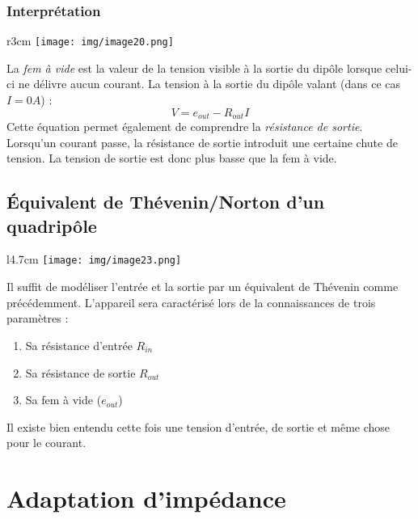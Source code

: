\documentclass[11pt, a4paper, openany]{book}
\begin{document}
		\subsubsection{Interprétation}
		\begin{wrapfigure}[8]{r}{3cm}
			\texttt{[image: img/image20.png]}
		\end{wrapfigure}
		La \textit{fem à vide} est la valeur de la tension visible à la sortie du dipôle lorsque celui-ci ne délivre aucun courant. La tension à la sortie du dipôle valant (dans ce cas $I = 0A$) :
		\begin{equation}
		V = e_{out} - R_{out}I
		\end{equation}
		Cette équation permet également de comprendre la \textit{résistance de sortie}. Lorsqu'un courant passe, la résistance de sortie introduit une certaine chute de tension. La tension de sortie est donc plus basse que la fem à vide.\\
		
		
		
		\setcounter{subsection}{3}
		\subsection{Équivalent de Thévenin/Norton d'un quadripôle}
		\begin{wrapfigure}[8]{l}{4.7cm}
			\texttt{[image: img/image23.png]}
		\end{wrapfigure}
		Il suffit de modéliser l'entrée et la sortie par un équivalent de Thévenin comme précédemment. L'appareil sera caractérisé lors de la connaissances de trois paramètres :
		\begin{enumerate}
			\item Sa résistance d'entrée $R_{in}$
			\item Sa résistance de sortie $R_{out}$
			\item Sa fem à vide ($e_{out}$)
		\end{enumerate}
		Il existe bien entendu cette fois une tension d'entrée, de sortie et même chose pour le courant.
		
		
		\section{Adaptation d'impédance}
\end{document}
